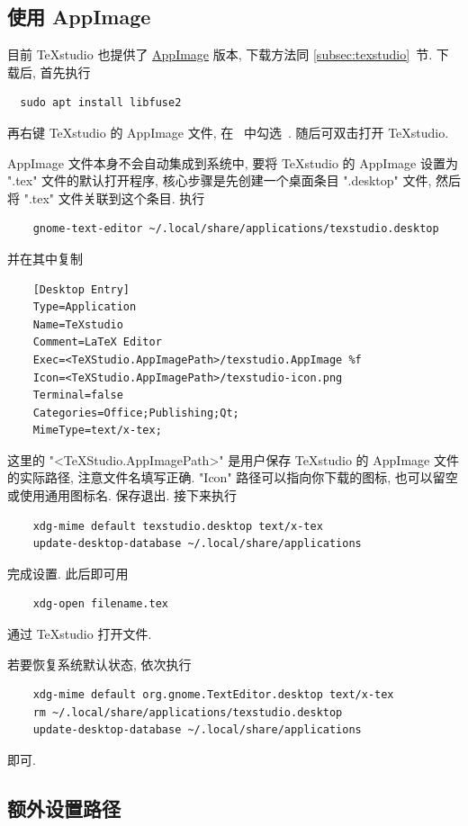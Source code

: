 \subsection{使用 AppImage}

目前 \TeX studio 也提供了 \href{https://appimage.org/}{AppImage} 版本,
下载方法同 \ref{subsec:texstudio}~节.
下载后,
首先执行
\begin{lstlisting}
  sudo apt install libfuse2
\end{lstlisting}
再右键 \TeX studio 的 AppImage 文件,
在\  中勾选\ .
随后可双击打开 \TeX studio.

AppImage 文件本身不会自动集成到系统中,
要将 \TeX studio 的 AppImage 设置为 ".tex" 文件的默认打开程序,
核心步骤是先创建一个桌面条目 ".desktop" 文件,
然后将 ".tex" 文件关联到这个条目.
执行
\begin{lstlisting}
    gnome-text-editor ~/.local/share/applications/texstudio.desktop
\end{lstlisting}
并在其中复制
\begin{lstlisting}
    [Desktop Entry]
    Type=Application
    Name=TeXstudio
    Comment=LaTeX Editor
    Exec=<TeXStudio.AppImagePath>/texstudio.AppImage %f
    Icon=<TeXStudio.AppImagePath>/texstudio-icon.png
    Terminal=false
    Categories=Office;Publishing;Qt;
    MimeType=text/x-tex;
\end{lstlisting}
这里的 "<TeXStudio.AppImagePath>" 是用户保存 \TeX studio 的 AppImage 文件的实际路径,
注意文件名填写正确.
"Icon" 路径可以指向你下载的图标,
也可以留空或使用通用图标名.
保存退出.
接下来执行
\begin{lstlisting}
    xdg-mime default texstudio.desktop text/x-tex
    update-desktop-database ~/.local/share/applications
\end{lstlisting}
完成设置.
此后即可用
\begin{lstlisting}
    xdg-open filename.tex
\end{lstlisting}
通过 \TeX studio 打开文件.

若要恢复系统默认状态,
依次执行
\begin{lstlisting}
    xdg-mime default org.gnome.TextEditor.desktop text/x-tex
    rm ~/.local/share/applications/texstudio.desktop
    update-desktop-database ~/.local/share/applications
\end{lstlisting}
即可.

\subsection{额外设置路径}

